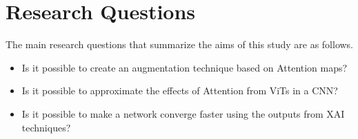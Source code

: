 \section{Research Questions} \label{section:researchq}
The main research questions that summarize the aims of this study are as follows.
\begin{itemize}
    \item Is it possible to create an augmentation technique based on Attention maps?
    \item Is it possible to approximate the effects of Attention from ViTs in a CNN?
    \item Is it possible to make a network converge faster using the outputs from XAI techniques?
\end{itemize}
